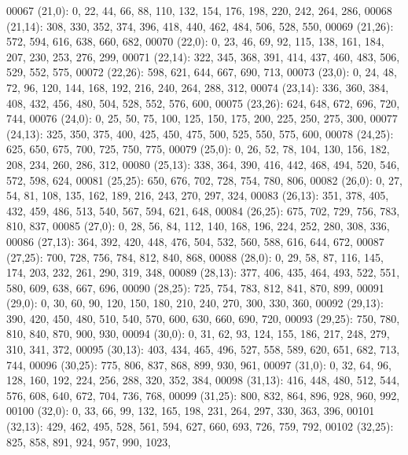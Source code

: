 \begin{DoxyCode}
00067       (21,0): 0, 22, 44, 66, 88, 110, 132, 154, 176, 198, 220, 242, 264, 286,
00068       (21,14): 308, 330, 352, 374, 396, 418, 440, 462, 484, 506, 528, 550,
00069       (21,26): 572, 594, 616, 638, 660, 682,
00070       (22,0): 0, 23, 46, 69, 92, 115, 138, 161, 184, 207, 230, 253, 276, 299,
00071       (22,14): 322, 345, 368, 391, 414, 437, 460, 483, 506, 529, 552, 575,
00072       (22,26): 598, 621, 644, 667, 690, 713,
00073       (23,0): 0, 24, 48, 72, 96, 120, 144, 168, 192, 216, 240, 264, 288, 312,
00074       (23,14): 336, 360, 384, 408, 432, 456, 480, 504, 528, 552, 576, 600,
00075       (23,26): 624, 648, 672, 696, 720, 744,
00076       (24,0): 0, 25, 50, 75, 100, 125, 150, 175, 200, 225, 250, 275, 300,
00077       (24,13): 325, 350, 375, 400, 425, 450, 475, 500, 525, 550, 575, 600,
00078       (24,25): 625, 650, 675, 700, 725, 750, 775,
00079       (25,0): 0, 26, 52, 78, 104, 130, 156, 182, 208, 234, 260, 286, 312,
00080       (25,13): 338, 364, 390, 416, 442, 468, 494, 520, 546, 572, 598, 624,
00081       (25,25): 650, 676, 702, 728, 754, 780, 806,
00082       (26,0): 0, 27, 54, 81, 108, 135, 162, 189, 216, 243, 270, 297, 324,
00083       (26,13): 351, 378, 405, 432, 459, 486, 513, 540, 567, 594, 621, 648,
00084       (26,25): 675, 702, 729, 756, 783, 810, 837,
00085       (27,0): 0, 28, 56, 84, 112, 140, 168, 196, 224, 252, 280, 308, 336,
00086       (27,13): 364, 392, 420, 448, 476, 504, 532, 560, 588, 616, 644, 672,
00087       (27,25): 700, 728, 756, 784, 812, 840, 868,
00088       (28,0): 0, 29, 58, 87, 116, 145, 174, 203, 232, 261, 290, 319, 348,
00089       (28,13): 377, 406, 435, 464, 493, 522, 551, 580, 609, 638, 667, 696,
00090       (28,25): 725, 754, 783, 812, 841, 870, 899,
00091       (29,0): 0, 30, 60, 90, 120, 150, 180, 210, 240, 270, 300, 330, 360,
00092       (29,13): 390, 420, 450, 480, 510, 540, 570, 600, 630, 660, 690, 720,
00093       (29,25): 750, 780, 810, 840, 870, 900, 930,
00094       (30,0): 0, 31, 62, 93, 124, 155, 186, 217, 248, 279, 310, 341, 372,
00095       (30,13): 403, 434, 465, 496, 527, 558, 589, 620, 651, 682, 713, 744,
00096       (30,25): 775, 806, 837, 868, 899, 930, 961,
00097       (31,0): 0, 32, 64, 96, 128, 160, 192, 224, 256, 288, 320, 352, 384,
00098       (31,13): 416, 448, 480, 512, 544, 576, 608, 640, 672, 704, 736, 768,
00099       (31,25): 800, 832, 864, 896, 928, 960, 992,
00100       (32,0): 0, 33, 66, 99, 132, 165, 198, 231, 264, 297, 330, 363, 396,
00101       (32,13): 429, 462, 495, 528, 561, 594, 627, 660, 693, 726, 759, 792,
00102       (32,25): 825, 858, 891, 924, 957, 990, 1023,

\end{DoxyCode}
